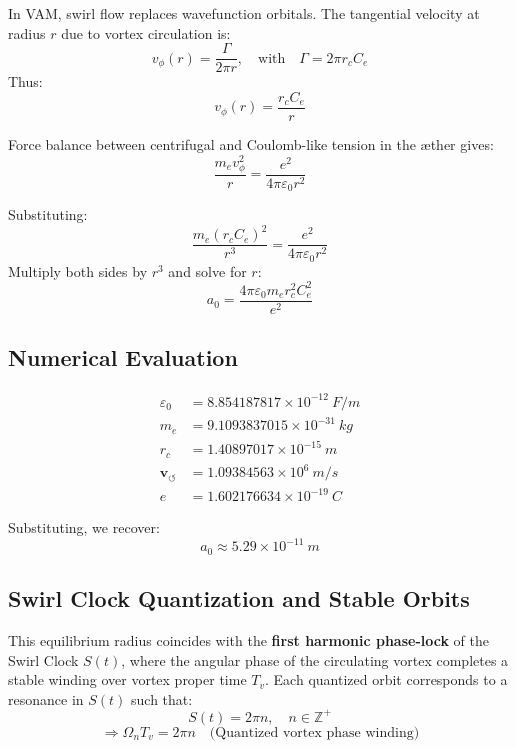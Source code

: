 \documentclass[preprint]{revtex4-2}
\begin{document}
In VAM, swirl flow replaces wavefunction orbitals. The tangential velocity at radius $r$ due to vortex circulation is:
\begin{equation}
    v_\phi(r) = \frac{\Gamma}{2\pi r}, \quad \text{with} \quad \Gamma = 2\pi r_c C_e
\end{equation}
Thus:
\begin{equation}
    v_\phi(r) = \frac{r_c C_e}{r}
\end{equation}

Force balance between centrifugal and Coulomb-like tension in the \ae ther gives:
\begin{equation}
    \frac{m_e v_\phi^2}{r} = \frac{e^2}{4\pi \varepsilon_0 r^2}
\end{equation}

Substituting:
\begin{equation}
    \frac{m_e (r_c C_e)^2}{r^3} = \frac{e^2}{4\pi \varepsilon_0 r^2}
\end{equation}
Multiply both sides by $r^3$ and solve for $r$:
\begin{equation}
    a_0 = \frac{4\pi \varepsilon_0 m_e r_c^2 C_e^2}{e^2}
\end{equation}

\subsection*{Numerical Evaluation}

\begin{align*}
    \varepsilon_0 &= 8.854187817 \times 10^{-12}~\si{F/m} \\
    m_e &= 9.1093837015 \times 10^{-31}~\si{kg} \\
    r_c &= 1.40897017 \times 10^{-15}~\si{m} \\
    \mathbf{v}_{\scriptscriptstyle\boldsymbol{\circlearrowleft}} &= 1.09384563 \times 10^6~\si{m/s} \\
    e &= 1.602176634 \times 10^{-19}~\si{C}
\end{align*}

Substituting, we recover:
\[
    a_0 \approx 5.29 \times 10^{-11}~\si{m}
\]

\subsection*{Swirl Clock Quantization and Stable Orbits}

This equilibrium radius coincides with the \textbf{first harmonic phase-lock} of the Swirl Clock $S(t)$, where the angular phase of the circulating vortex completes a stable winding over vortex proper time $T_v$. Each quantized orbit corresponds to a resonance in $S(t)$ such that:
\[
    S(t) = 2\pi n, \quad n \in \mathbb{Z}^+
\]
\[
    \Rightarrow \Omega_n T_v = 2\pi n \quad \text{(Quantized vortex phase winding)}
\]
\end{document}
